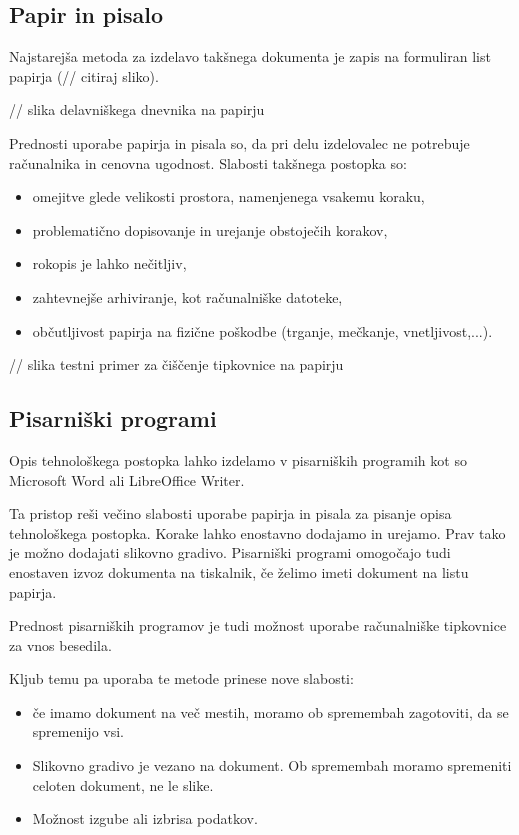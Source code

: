 \documentclass[a4paper, 12pt]{book}
\begin{document}
\subsection{Papir in pisalo}

Najstarejša metoda za izdelavo takšnega dokumenta je zapis na formuliran list papirja (// citiraj sliko).

// slika delavniškega dnevnika na papirju

Prednosti uporabe papirja in pisala so, da pri delu izdelovalec ne potrebuje računalnika in cenovna ugodnost.
Slabosti takšnega postopka so:
\begin{itemize}
	\item omejitve glede velikosti prostora, namenjenega vsakemu koraku,
	\item problematično dopisovanje in urejanje obstoječih korakov,
	\item rokopis je lahko nečitljiv,
	\item zahtevnejše arhiviranje, kot računalniške datoteke,
	\item občutljivost papirja na fizične poškodbe (trganje, mečkanje, vnetljivost,...).
\end{itemize}

// slika testni primer za čiščenje tipkovnice na papirju

\subsection{Pisarniški programi}

Opis tehnološkega postopka lahko izdelamo v pisarniških programih kot so Microsoft Word ali LibreOffice Writer.

Ta pristop reši večino slabosti uporabe papirja in pisala za pisanje opisa tehnološkega postopka.
Korake lahko enostavno dodajamo in urejamo.
Prav tako je možno dodajati slikovno gradivo.
Pisarniški programi omogočajo tudi enostaven izvoz dokumenta na tiskalnik, če želimo imeti dokument na listu papirja.

Prednost pisarniških programov je tudi možnost uporabe računalniške tipkovnice za vnos besedila.

Kljub temu pa uporaba te metode prinese nove slabosti:
\begin{itemize}
	\item če imamo dokument na več mestih, moramo ob spremembah zagotoviti, da se spremenijo vsi.
	\item Slikovno gradivo je vezano na dokument. Ob spremembah moramo spremeniti celoten dokument, ne le slike.
	\item Možnost izgube ali izbrisa podatkov.
\end{itemize}
\end{document}
